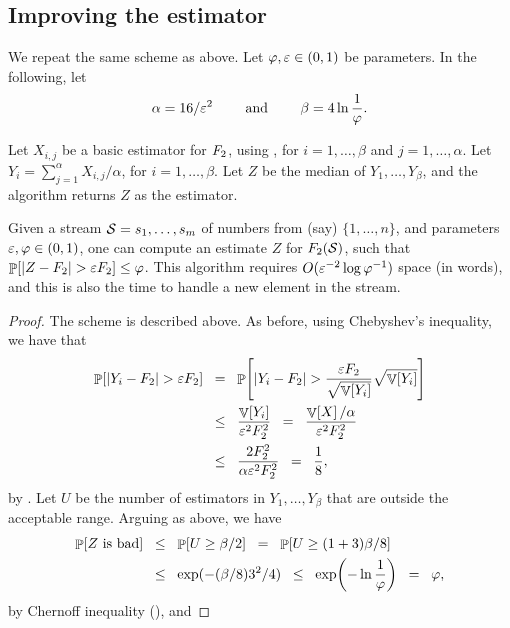 
\subsection{Improving the estimator}

We repeat the same scheme as above.  Let $\varphi, {\varepsilon} \in (0,1)$ be
parameters.  In the following, let
\begin{equation*}
    \alpha = 16 / \eps^2%
    \qquad\text{ and }\qquad%
    \beta = 4 \ln \frac{1}{\BadProb}.%
\end{equation*}

Let $X_{i,j}$ be a basic estimator for $F_2$, using ,
for $i=1,\ldots, \beta$ and $j=1, \ldots, \alpha$.  Let
$Y_i = \sum_{j=1}^{\alpha} X_{i,j} / \alpha$, for $i=1, \ldots, \beta$. Let
$Z$ be the median of $Y_1, \ldots, Y_\beta$, and the algorithm returns
$Z$ as the estimator.



\begin{theorem}
    Given a stream $\mathcal{S} = {s}_1, \ldots, {s}_m$ of numbers from (say)
    $\{1,\ldots, n\}$, and parameters ${\varepsilon}, \varphi \in (0,1)$, one
    can compute an estimate $Z$ for $F_2(\mathcal{S})$, such that
    $\Prob{ |Z - \Frq_2| > \eps \Frq_2} \leq \BadProb$. This algorithm
    requires $O( {\varepsilon}^{-2} \log \varphi^{-1})$ space (in words), and
    this is also the time to handle a new element in the stream.
\end{theorem}
\begin{proof}
    The scheme is described above. As before, using Chebyshev's
    inequality, we have that
    \begin{align*}
        \Prob{ \cardin{Y_i - \Frq_2} > \eps \Frq_2 }%
        &\EQ%
        \Prob{ \cardin{Y_i - \Frq_2} >
           \frac{\eps \Frq_2}{ \sqrt{\Var{Y_i}}} \sqrt{\Var{Y_i}}}%
        \\&
        \LEQ%
        \frac{\Var{Y_i}}{\eps^2 \Frq_2^2}%
        \EQ%
        \frac{\Var{X} / \alpha}{\eps^2 \Frq_2^2}%
        \\&
        \LEQ %
        \frac{2 \Frq_2^2}{\alpha \eps^2 \Frq_2^2}%
        \EQ%
        \frac{1}{8},
    \end{align*}
    by . Let $U$ be the number of estimators in
    $Y_1, \ldots, Y_\beta$ that are outside the acceptable range.
    Arguing as above, we have
    \begin{align*}
        \Prob{Z \text{ is bad}}%
        &\LEQ%
        \Prob{U \geq \beta/2} %
        \EQ %
        \Prob{U \geq (1+ 3)\beta/8}%
        \\&
        \LEQ%
        \exp( - (\beta/8) 3^2/4 )%
        \LEQ%
        \exp\pth{ - \ln \frac{1}{\BadProb}}
        \EQ%
        \BadProb,
    \end{align*}
    by Chernoff inequality (), and
\end{proof}

